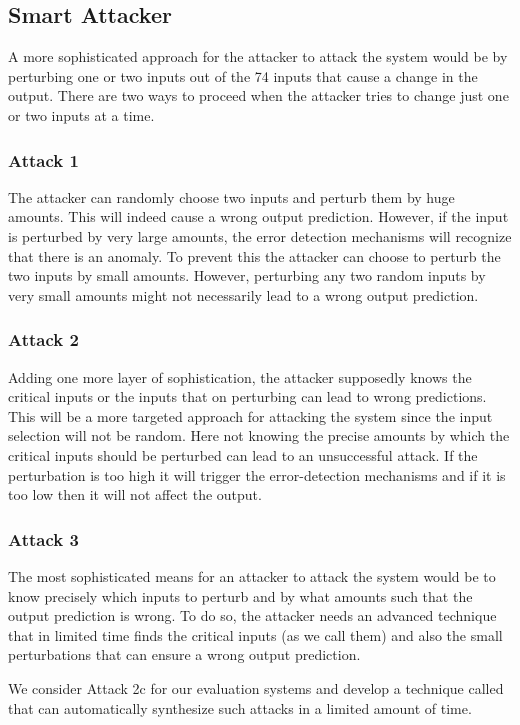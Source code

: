\subsection{Smart Attacker}
A more sophisticated approach for the attacker to attack the system would be by perturbing one or two inputs out of the 74 inputs that cause a change in the output. There are two ways to proceed when the attacker tries to change just one or two inputs at a time. 

\subsubsection{Attack 1}
The attacker can randomly choose two inputs and perturb them by huge amounts. This will indeed cause a wrong output prediction. However, if the input is perturbed by very large amounts, the error detection mechanisms will recognize that there is an anomaly. To prevent this the attacker can choose to perturb the two inputs by small amounts. However, perturbing any two random inputs by very small amounts might not necessarily lead to a wrong output prediction.

\subsubsection{Attack 2}
Adding one more layer of sophistication, the attacker supposedly knows the critical inputs or the inputs that on perturbing can lead to wrong predictions. This will be a more targeted approach for attacking the system since the input selection will not be random. Here not knowing the precise amounts by which the critical inputs should be perturbed can lead to an unsuccessful attack. If the perturbation is too high it will trigger the error-detection mechanisms and if it is too low then it will not affect the output. 
\subsubsection{Attack 3}
The most sophisticated means for an attacker to attack the system would be to know precisely which inputs to perturb and by what amounts such that the output prediction is wrong. To do so, the attacker needs an advanced technique that in limited time finds the critical inputs (as we call them) and also the small perturbations that can ensure a wrong output prediction. 

We consider Attack 2c for our evaluation systems and develop a technique called \tool that can automatically synthesize such attacks in a limited amount of time. 



